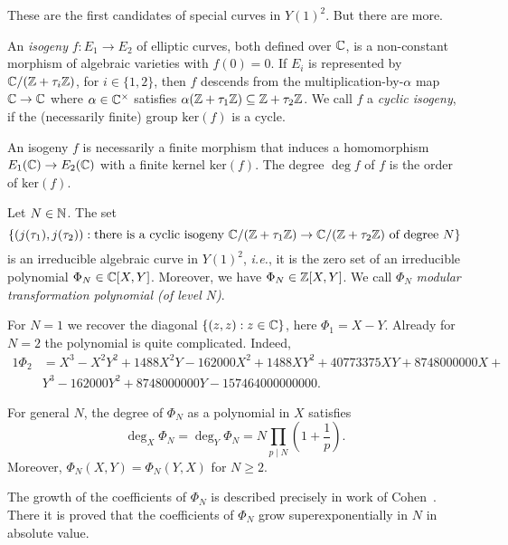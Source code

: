 These are the first candidates of special curves in $Y(1)^2$. 
But there are more.

\begin{definition}
  An \emph{isogeny} $f\colon E_1\rightarrow E_2$ of elliptic curves,
  both defined over ${\mathbb{C}}$, is a non-constant morphism of algebraic
  varieties with $f(0)=0$. If $E_i$ is represented by
  ${\mathbb{C}}/({\mathbb{Z}}+\tau_i{\mathbb{Z}})$, for $i\in \{1,2\}$, then $f$ descends from the
  multiplication-by-$\alpha$ map ${\mathbb{C}}\rightarrow{\mathbb{C}}$ where
  $\alpha\in{\mathbb{C}}^\times$ satisfies $\alpha({\mathbb{Z}}+\tau_1{\mathbb{Z}})\subseteq
  {\mathbb{Z}}+\tau_2{\mathbb{Z}}$.
  We call $f$ a \emph{cyclic isogeny}, if the (necessarily finite)
  group
  $\mathrm{ker}(f)$ is a cycle.
\end{definition}

An isogeny $f$ is necessarily a finite morphism
that induces a homomorphism $E_1({\mathbb{C}})\rightarrow E_2({\mathbb{C}})$ 
with a finite kernel $\mathrm{ker}(f)$.
The degree $\deg f$ of $f$ is the order of $\mathrm{ker}(f)$. 


\begin{deflemma}
  \label{deflem:modtranspoly}
  Let $N\in{\mathbb{N}}$. The set
  \begin{equation*}
    \left\{ (j(\tau_1),j(\tau_2)) : \text{there is a cyclic isogeny 
        ${\mathbb{C}}/({\mathbb{Z}}+\tau_1{\mathbb{Z}})\rightarrow {\mathbb{C}}/({\mathbb{Z}}+\tau_2{\mathbb{Z}})$ of degree $N$}\right\}
  \end{equation*}
  is an irreducible algebraic curve in $Y(1)^2$, \textit{i.e.}, it is
  the zero set of an irreducible polynomial $\Phi_N\in{\mathbb{C}}[X,Y]$.
  Moreover, we have $\Phi_N\in{\mathbb{Z}}[X,Y]$. We call $\Phi_N$
  \emph{modular transformation polynomial (of level $N$)}.
\end{deflemma}

\begin{example}
  For $N=1$ we recover the diagonal $\{(z,z) : z\in{\mathbb{C}}\}$, here $\Phi_1
  = X-Y$. 
  Already for $N=2$ the polynomial is quite complicated. Indeed,
  \begin{alignat*}1
    \Phi_2 &= 
    X^3 - X^2Y^2 + 1488X^2Y - 162000X^2 + 1488XY^2+ 40773375XY +
    8748000000X + \\
    &Y^3 - 162000Y^2 + 8748000000Y -157464000000000.    
  \end{alignat*}

  For general $N$, the degree of $\Phi_N$ as a polynomial in $X$
  satisfies
  \begin{equation*}
    \deg_X \Phi_N = \deg_Y\Phi_N= N\prod_{p\mid N}\left(1+\frac 1p\right). 
  \end{equation*}
  Moreover, $\Phi_N(X,Y) = \Phi_N(Y,X)$ for $N\ge 2$.

  The growth of the coefficients of $\Phi_N$ is described precisely in
  work of Cohen~\cite{Cohen}. There it is proved that the
  coefficients of $\Phi_N$ grow superexponentially in $N$ in absolute value. 
\end{example}

